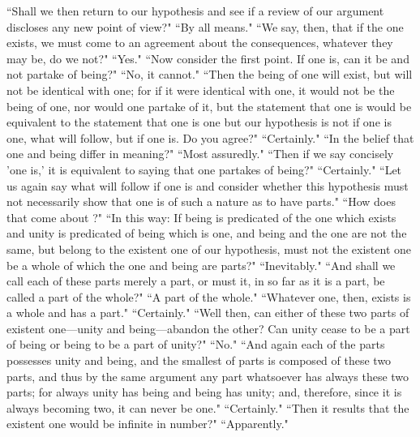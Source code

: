 \documentclass[letterpaper,12pt]{article}
\newcommand{\stephpag}[1]{\marginnote{\small\itshape\fontfamily{ppl}\selectfont #1}}
\begin{document}
``Shall we then return to our hypothesis and see \stephpag{b} if a review of our argument discloses any new point of view?" ``By all means." ``We say, then, that if the one exists, we must come to an agreement about the consequences, whatever they may be, do we not?" ``Yes." ``Now consider the first point. If one is, can it be and not partake of being?" ``No, it cannot." ``Then the being of one will exist, but will not be identical with one; for if it were identical with one, it would not be the being of one, nor would one partake of it, \stephpag{c} but the statement that one is would be equivalent to the statement that one is one but our hypothesis is not if one is one, what will follow, but if one is. Do you agree?" ``Certainly." ``In the belief that one and being differ in meaning?" ``Most assuredly." ``Then if we say concisely 'one is,' it is equivalent to saying that one partakes of being?" ``Certainly." ``Let us again say what will follow if one is and consider whether this hypothesis must not necessarily show that one is of such a nature as to have parts." ``How does that come about ?" ``In this way: \stephpag{d} If being is predicated of the one which exists and unity is predicated of being which is one, and being and the one are not the same, but belong to the existent one of our hypothesis, must not the existent one be a whole of which the one and being are parts?" ``Inevitably." ``And shall we call each of these parts merely a part, or must it, in so far as it is a part, be called a part of the whole?" ``A part of the whole." ``Whatever one, then, exists is a whole and has a part." ``Certainly." ``Well then, can either of these two parts of existent one—unity and being—abandon the other? \stephpag{e} Can unity cease to be a part of being or being to be a part of unity?" ``No." ``And again each of the parts possesses unity and being, and the smallest of parts is composed of these two parts, and thus by the same argument any part whatsoever has always these two parts; for always unity has being and being has unity; \stephpag{143 a} and, therefore, since it is always becoming two, it can never be one." ``Certainly." ``Then it results that the existent one would be infinite in number?" ``Apparently."
\end{document}
